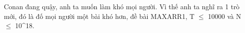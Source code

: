 Conan đang quậy, anh ta muốn làm khó mọi người. Vì thế anh ta nghĩ ra 1 trò mới, đó là đố mọi người một bài khó hơn, đề bài MAXARR1, T  $\le$  10000 và N  $\le$  10^18.